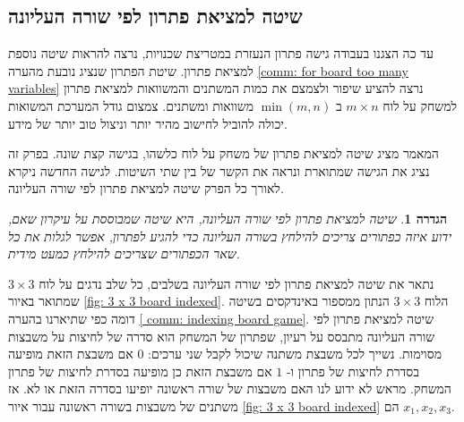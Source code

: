 \documentclass[12pt,leqno]{article}
\theoremstyle{theoremdd}
\newtheorem{definition}{הגדרה}[section]
\begin{document}
\subsection{שיטה למציאת פתרון לפי שורה העליונה}
עד כה
הצגנו
בעבודה
גישה פתרון
הנעזרת במטריצת שכנויות,
נרצה להראות שיטה נוספת למציאת פתרון.
שיטת הפתרון שנציג נובעת מהערה 
\ref{comm: for board too many variables}
נרצה להציע שיפור ולצמצם את כמות המשתנים והמשוואות 
למציאת פתרון למשחק על לוח 
$ m \times n$
ב
$\min(m,n)$
משוואות ומשתנים.
צמצום גודל המערכת המשואות יכולה להוביל לחישוב מהיר יותר וניצול טוב יותר של מידע.

המאמר 
\cite{B1}
מציג שיטה למציאת פתרון
של משחק על לוח כלשהו,
בגישה קצת שונה.
בפרק זה נציג את הגישה שמתוארת 
\cite{B1}
ונראה את הקשר של בין שתי השיטות.
לגישה החדשה ניקרא לאורך כל הפרק שיטה למציאת פתרון לפי שורה העליונה.

\begin{definition}
    \label{def: spanish way}
    שיטה למציאת פתרון לפי שורה העליונה, היא שיטה שמבוססת על עיקרון 
    שאם, ידוע איזה כפתורים צריכים להילחץ בשורה העליונה כדי להגיע לפתרון, אפשר לגלות את כל שאר הכפתורים שצריכים להילחץ 
    כמעט מידית.
\end{definition}
נתאר את 
שיטה למציאת פתרון לפי שורה העליונה
בשלבים,
כל שלב נדגים
על לוח 
$3 \times 3$
שמתואר באיור 
\ref{fig: 3 x 3 board indexed}.
הלוח 
$3 \times 3$
הנתון ממספור באינדקסים 
בשיטה דומה כפי שתיארנו בהערה 
\ref{ comm: indexing board game}.
שיטה למציאת פתרון לפי שורה העליונה
מתבסס על רעיון,
שפתרון של המשחק הוא סדרה של לחיצות על משבצות מסוימות. נשייך
 לכל משבצת משתנה שיכול לקבל שני ערכים: 
 $0$
  אם משבצת הזאת מופיעה בסדרת לחיצות של פתרון
 ו-
 $1$
 אם משבצת הזאת כן מופיעה בסדרת לחיצות של פתרון המשחק.
  מראש לא ידוע לנו
 האם משבצות של שורה ראשונה יופיעו בסדרה הזאת או לא. אז משתנים של משבצות בשורה ראשונה
 עבור
 איור 
 \ref{fig: 3 x 3 board indexed}
 הם
 $x_1, x_2, x_3$.
\end{document}
